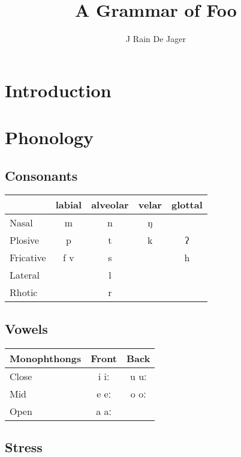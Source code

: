 \documentclass{clgrammar}
\title{A Grammar of Foo}
\author{J Rain De Jager}
\begin{document}
\maketitle

\tableofcontents

\mainmatter
\chapter{Introduction}


\chapter{Phonology}

\section{Consonants}

\begin{center}
    \begin{tabular}{l|c|c|c|c}
        & labial & alveolar & velar & glottal \\
        \hline
        Nasal & m & n & ŋ & \\
        Plosive & p & t & k & ʔ \\
        Fricative & f v & s & & h \\
        Lateral & & l & & \\
        Rhotic & & r & &
    \end{tabular}
\end{center}

\section{Vowels}

\begin{center}
    \begin{tabular}{l|c|c}
        Monophthongs & Front & Back \\
        \hline
        Close & i iː & u uː \\
        Mid & e eː & o oː \\
        Open & a aː
    \end{tabular}
\end{center}

\section{Stress}
\end{document}

